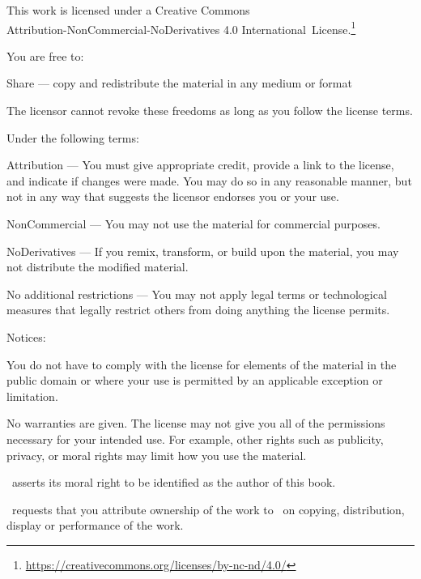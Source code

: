 \cleartorecto
\thispagestyle{plain}

{\fontsize{10}{14}\selectfont%
\setlength{\parindent}{0pt}%
\raggedright\label{copyright-details}%
\setlength{\parskip}{7pt}%

{\centering

{\LARGE\ccbyncnd}

This work is licensed under a Creative Commons\\
Attribution-NonCommercial-NoDerivatives 4.0 International~License.\footnote{%
\href{https://creativecommons.org/licenses/by-nc-nd/4.0/}{https://creativecommons.org/licenses/by-nc-nd/4.0/}}

}

You are free to:

\begin{packeditemize}
\item Share — copy and redistribute the material in any medium or format
\end{packeditemize}

The licensor cannot revoke these freedoms as long as you follow the license terms.

Under the following terms:

\begin{packeditemize}
\item Attribution — You must give appropriate credit, provide a link to the license, and indicate if changes were made. You may do so in any reasonable manner, but not in any way that suggests the licensor endorses you or your use.
\item NonCommercial — You may not use the material for commercial purposes.
\item NoDerivatives — If you remix, transform, or build upon the material, you may not distribute the modified material.
\end{packeditemize}

No additional restrictions — You may not apply legal terms or technological measures that legally restrict others from doing anything the license permits.

Notices:

You do not have to comply with the license for elements of the material in the public domain or where your use is permitted by an applicable exception or limitation.

No warranties are given. The license may not give you all of the permissions necessary for your intended use. For example, other rights such as publicity, privacy, or moral rights may limit how you use the material.


\thePublisher\ asserts its moral right to be identified as the author of this book.

\thePublisher\ requests that you attribute ownership of the work to \thePublisher\ on copying, distribution, display or performance of the work.

}
